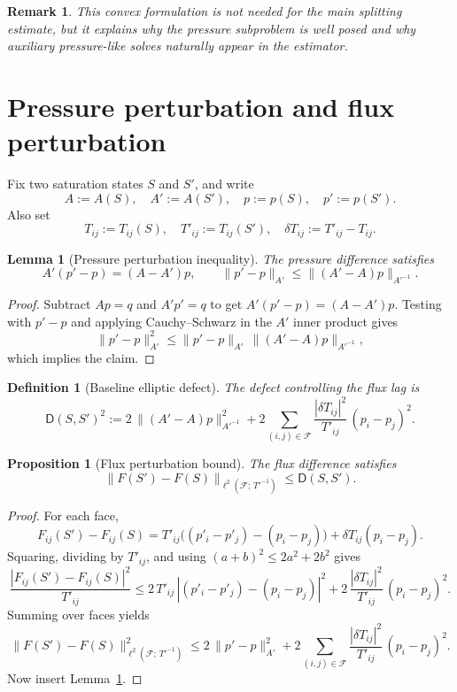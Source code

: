 \documentclass[11pt]{article}
\newtheorem{proposition}[theorem]{Proposition}
\newtheorem{lemma}[theorem]{Lemma}
\newtheorem{definition}[theorem]{Definition}
\newtheorem*{remark}{Remark}
\begin{document}
\begin{remark}
This convex formulation is not needed for the main splitting estimate, but it
explains why the pressure subproblem is well posed and why auxiliary
pressure-like solves naturally appear in the estimator.
\end{remark}

\section{Pressure perturbation and flux perturbation}\label{sec:pressure-flux}

Fix two saturation states $S$ and $S'$, and write
\[
  A := A(S),\quad A' := A(S'),\quad p := p(S),\quad p' := p(S').
\]
Also set
\[
  T_{ij} := T_{ij}(S),\quad T'_{ij} := T_{ij}(S'),\quad
  \delta T_{ij} := T'_{ij} - T_{ij}.
\]

\begin{lemma}[Pressure perturbation inequality]\label{lem:pressure-pert}
The pressure difference satisfies
\[
  A'(p'-p) = (A - A')p,\qquad
  \|p'-p\|_{A'} \le \|(A'-A)p\|_{A'^{-1}}.
\]
\end{lemma}

\begin{proof}
Subtract $Ap = q$ and $A'p' = q$ to get $A'(p'-p) = (A-A')p$.  Testing with
$p'-p$ and applying Cauchy--Schwarz in the $A'$ inner product gives
\[
  \|p'-p\|^2_{A'} \le \|p'-p\|_{A'}\,\|(A'-A)p\|_{A'^{-1}},
\]
which implies the claim.
\end{proof}

\begin{definition}[Baseline elliptic defect]\label{def:defect}
The defect controlling the flux lag is
\begin{equation}\label{eq:defect}
  \mathsf{D}(S,S')^2
    := 2\,\|(A'-A)p\|^2_{A'^{-1}}
     + 2\sum_{(i,j)\in\mathcal{F}}
         \frac{|\delta T_{ij}|^2}{T'_{ij}}\,(p_i - p_j)^2.
\end{equation}
\end{definition}

\begin{proposition}[Flux perturbation bound]\label{prop:flux-pert}
The flux difference satisfies
\[
  \|F(S') - F(S)\|_{\ell^2(\mathcal{F};\,T'^{-1})}
    \le \mathsf{D}(S,S').
\]
\end{proposition}

\begin{proof}
For each face,
\[
  F_{ij}(S') - F_{ij}(S)
    = T'_{ij}\bigl((p'_i - p'_j) - (p_i - p_j)\bigr)
    + \delta T_{ij}(p_i - p_j).
\]
Squaring, dividing by $T'_{ij}$, and using $(a+b)^2\le 2a^2+2b^2$ gives
\[
  \frac{|F_{ij}(S')-F_{ij}(S)|^2}{T'_{ij}}
    \le 2\,T'_{ij}\,|(p'_i-p'_j)-(p_i-p_j)|^2
     + 2\,\frac{|\delta T_{ij}|^2}{T'_{ij}}\,(p_i-p_j)^2.
\]
Summing over faces yields
\[
  \|F(S')-F(S)\|^2_{\ell^2(\mathcal{F};\,T'^{-1})}
    \le 2\,\|p'-p\|^2_{A'}
     + 2\sum_{(i,j)\in\mathcal{F}}
         \frac{|\delta T_{ij}|^2}{T'_{ij}}\,(p_i-p_j)^2.
\]
Now insert Lemma~\ref{lem:pressure-pert}.
\end{proof}
\end{document}
